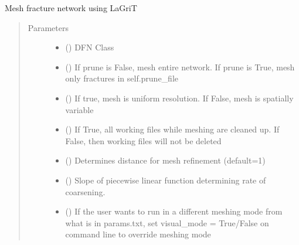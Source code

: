 \documentclass[letterpaper,10pt,english]{sphinxmanual}
\begin{document}
\begin{fulllineitems}
\begin{fulllineitems}
\label{\detokenize{pydfnworks:pydfnworks.general.dfnworks.DFNWORKS.mesh_network}}
Mesh fracture network using LaGriT
\begin{quote}\begin{description}
\item[{Parameters}] \leavevmode\begin{itemize}
\item {} 
 () \textendash{} DFN Class

\item {} 
 () \textendash{} If prune is False, mesh entire network. If prune is True, mesh only fractures in self.prune\_file

\item {} 
 () \textendash{} If true, mesh is uniform resolution. If False, mesh is spatially variable

\item {} 
 () \textendash{} If True, all working files while meshing are cleaned up. If False, then working files will not be deleted

\item {} 
 () \textendash{} Determines distance for mesh refinement (default=1)

\item {} 
 () \textendash{} Slope of piecewise linear function determining rate of coarsening.

\item {} 
 () \textendash{} If the user wants to run in a different meshing mode from what is in params.txt, set visual\_mode = True/False on command line to override meshing mode


\end{itemize}
\end{description}
\end{quote}
\end{fulllineitems}
\end{fulllineitems}
\end{document}
